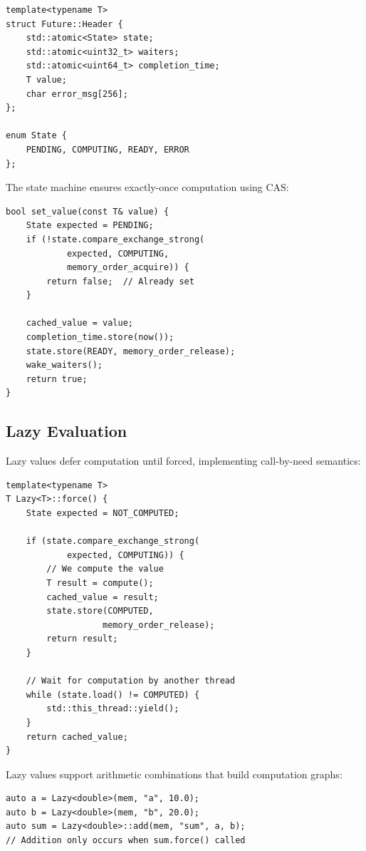 \documentclass[10pt,conference]{IEEEtran}
\begin{document}
\begin{lstlisting}[caption={Future Structure},label={lst:future}]
template<typename T>
struct Future::Header {
    std::atomic<State> state;
    std::atomic<uint32_t> waiters;
    std::atomic<uint64_t> completion_time;
    T value;
    char error_msg[256];
};

enum State {
    PENDING, COMPUTING, READY, ERROR
};
\end{lstlisting}

The state machine ensures exactly-once computation using CAS:

\begin{lstlisting}[caption={Future Set Operation},label={lst:futureset}]
bool set_value(const T& value) {
    State expected = PENDING;
    if (!state.compare_exchange_strong(
            expected, COMPUTING,
            memory_order_acquire)) {
        return false;  // Already set
    }
    
    cached_value = value;
    completion_time.store(now());
    state.store(READY, memory_order_release);
    wake_waiters();
    return true;
}
\end{lstlisting}

\subsection{Lazy Evaluation}

Lazy values defer computation until forced, implementing call-by-need semantics:

\begin{lstlisting}[caption={Lazy Computation},label={lst:lazy}]
template<typename T>
T Lazy<T>::force() {
    State expected = NOT_COMPUTED;
    
    if (state.compare_exchange_strong(
            expected, COMPUTING)) {
        // We compute the value
        T result = compute();
        cached_value = result;
        state.store(COMPUTED, 
                   memory_order_release);
        return result;
    }
    
    // Wait for computation by another thread
    while (state.load() != COMPUTED) {
        std::this_thread::yield();
    }
    return cached_value;
}
\end{lstlisting}

Lazy values support arithmetic combinations that build computation graphs:

\begin{lstlisting}[caption={Lazy Arithmetic},label={lst:lazymath}]
auto a = Lazy<double>(mem, "a", 10.0);
auto b = Lazy<double>(mem, "b", 20.0);
auto sum = Lazy<double>::add(mem, "sum", a, b);
// Addition only occurs when sum.force() called
\end{lstlisting}
\end{document}
